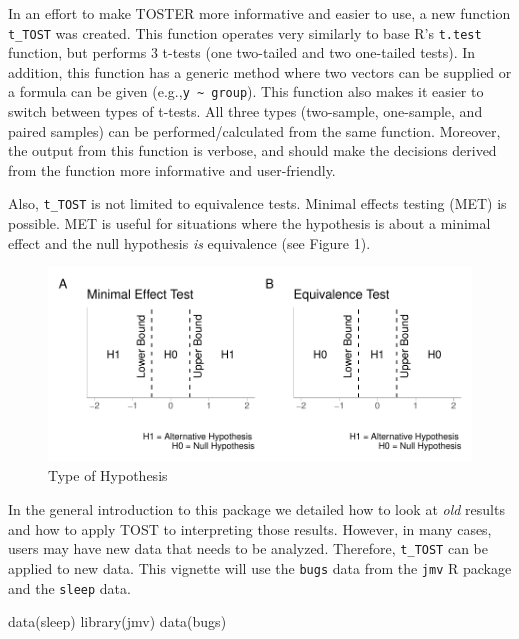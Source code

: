 \documentclass[]{interact}
\theoremstyle{plain}%
\theoremstyle{definition}
\theoremstyle{remark}
\newenvironment{Shaded}{\begin{snugshade}}{\end{snugshade}}
\newcommand{\FunctionTok}[1]{\textcolor[rgb]{0.00,0.00,0.00}{#1}}
\newcommand{\NormalTok}[1]{#1}
\newcommand{\StringTok}[1]{\textcolor[rgb]{0.31,0.60,0.02}{#1}}
\begin{document}
In an effort to make TOSTER more informative and easier to use, a new
function \texttt{t\_TOST} was created. This function operates very
similarly to base R's \texttt{t.test} function, but performs 3 t-tests
(one two-tailed and two one-tailed tests). In addition, this function
has a generic method where two vectors can be supplied or a formula can
be given (e.g.,\texttt{y\ \textasciitilde{}\ group}). This function also
makes it easier to switch between types of t-tests. All three types
(two-sample, one-sample, and paired samples) can be performed/calculated
from the same function. Moreover, the output from this function is
verbose, and should make the decisions derived from the function more
informative and user-friendly.

Also, \texttt{t\_TOST} is not limited to equivalence tests. Minimal
effects testing (MET) is possible. MET is useful for situations where
the hypothesis is about a minimal effect and the null hypothesis
\emph{is} equivalence (see Figure 1).

\begin{figure}
\centering
\includegraphics{Avocado_Update_files/figure-latex/hypplot-1.pdf}
\caption{Type of Hypothesis}
\end{figure}

\newpage

In the general introduction to this package we detailed how to look at
\emph{old} results and how to apply TOST to interpreting those results.
However, in many cases, users may have new data that needs to be
analyzed. Therefore, \texttt{t\_TOST} can be applied to new data. This
vignette will use the \texttt{bugs} data from the \texttt{jmv} R package
and the \texttt{sleep} data.

\begin{Shaded}
\begin{Highlighting}[]
\FunctionTok{data}\NormalTok{(}\StringTok{\textquotesingle{}sleep\textquotesingle{}}\NormalTok{)}
\FunctionTok{library}\NormalTok{(jmv)}
\FunctionTok{data}\NormalTok{(}\StringTok{\textquotesingle{}bugs\textquotesingle{}}\NormalTok{)}
\end{Highlighting}
\end{Shaded}
\end{document}

